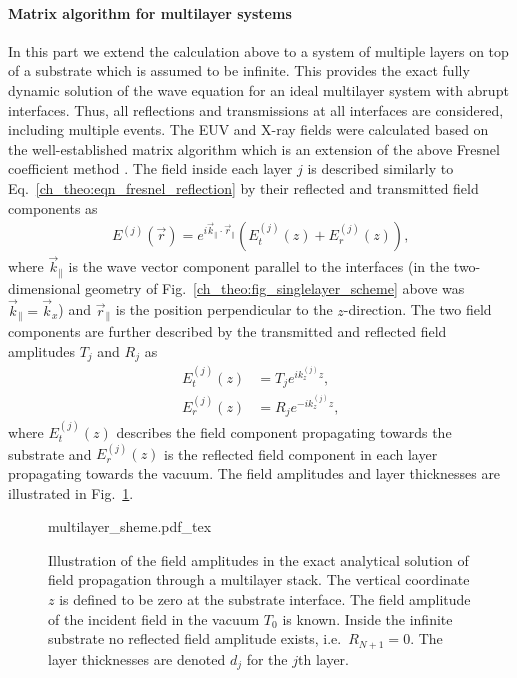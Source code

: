 \paragraph{Matrix algorithm for multilayer systems} \label{ch_theo:sec_matrix_algorithm}
In this part we extend the calculation above to a system of multiple layers on top of a substrate which is assumed to be infinite. This provides the exact fully dynamic solution of the wave equation for an ideal multilayer system with abrupt interfaces. Thus, all reflections and transmissions at all interfaces are considered, including multiple events. The EUV and X-ray fields were calculated based on the well-established matrix algorithm which is an extension of the above Fresnel coefficient method \cite{born_principles_1965,mikulik_x-ray_1997}. The field inside each layer $j$ is described similarly to Eq.~\eqref{ch_theo:eqn_fresnel_reflection} by their reflected and transmitted field components as
\begin{align}
E^{(j)}(\vec{r}) = e^{i \vec{k}_\parallel \cdot \vec{r}_\parallel} (E_t^{(j)}(z) + E_r^{(j)}(z)) \text{,} \label{ch_theo:eqn_multilayer_solution_transmitted_and_reflected}
\end{align}
where $\vec{k}_\parallel$ is the wave vector component parallel to the interfaces (in the two-dimensional geometry of Fig.~\ref{ch_theo:fig_singlelayer_scheme} above was $\vec{k}_\parallel = \vec{k}_x$) and $\vec{r}_\parallel$ is the position perpendicular to the $z$-direction. The two field components are further described by the transmitted and reflected field amplitudes $T_j$ and $R_j$ as
\begin{align}
E_t^{(j)}(z) &= T_{j} e^{i k_z^{(j)} z} \text{,} \label{ch_theo:eqn_multilayer_amplitude_transmitted} \\
E_r^{(j)}(z) &= R_{j} e^{-i k_z^{(j)} z} \text{,} \label{ch_theo:eqn_multilayer_amplitude_reflected}
\end{align}
where $E_t^{(j)}(z)$ describes the field component propagating towards the substrate and $E_r^{(j)}(z)$ is the reflected field component in each layer propagating towards the vacuum. The field amplitudes and layer thicknesses are illustrated in Fig.~\ref{ch_theo:fig_multilayer_scheme}.
\begin{figure}[htb]
    {multilayer_sheme.pdf_tex}
    \caption[Field amplitudes in the exact solution for a multilayer system.]{Illustration of the field amplitudes in the exact analytical solution of field propagation through a multilayer stack. The vertical coordinate $z$ is defined to be zero at the substrate interface. The field amplitude of the incident field in the vacuum $T_0$ is known. Inside the infinite substrate no reflected field amplitude exists, i.e.~$R_{N+1} = 0$. The layer thicknesses are denoted $d_j$ for the $j$th layer.}
    \label{ch_theo:fig_multilayer_scheme}
\end{figure}
